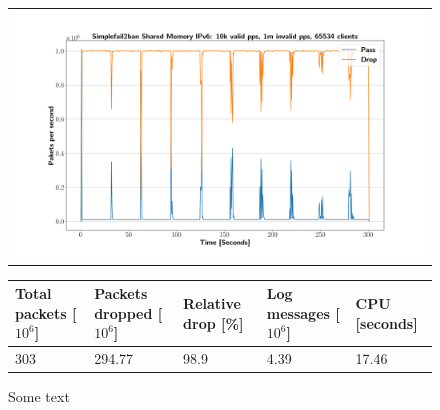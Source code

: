 \begin{figure}[p]
	\label{fig:simplefail2ban:shm:ip6:1m}
	\centering
	\scriptsize
	\begin{tabular}{c}
    	\centerline{\includegraphics[width=1.2\textwidth]{images/simplefail2ban_shm_ipv6_v10k_iv1m_c65534.png}}
	\end{tabular}
	\begin{tabular}{lllll}
		\toprule
		\textbf{Total packets [$10^6$]} & \textbf{Packets dropped [$10^6$]} & \textbf{Relative drop [\%]} & \textbf{Log messages [$10^6$]} & \textbf{CPU [seconds]} \\ \midrule 
		303 & 294.77 & 98.9 & 4.39 & 17.46 \\
		\bottomrule
	\end{tabular}
	\caption[Simplefail2ban Shared Memory IPv6 1m PPS]{Some text}
\end{figure}

